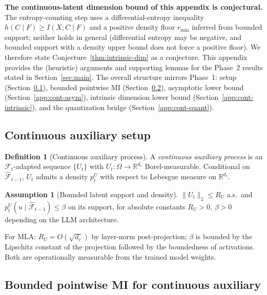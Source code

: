 \documentclass[11pt]{article}
\newcommand{\R}{\mathbb{R}}
\newcommand{\F}{\mathcal{F}}
\theoremstyle{plain}
\theoremstyle{definition}
\newtheorem{definition}[theorem]{Definition}
\newtheorem{assumption}[theorem]{Assumption}
\theoremstyle{remark}
\begin{document}
\textbf{The continuous-latent dimension bound of this appendix is
conjectural.} The entropy-counting step uses a differential-entropy
inequality $h(C\mid F)\ge I(X;C\mid F)$ and a positive density floor
$r_{\min}$ inferred from bounded support; neither holds in general
(differential entropy may be negative, and bounded support with a
density upper bound does not force a positive floor). We therefore
state Conjecture~\ref{thm:intrinsic-dim} as a conjecture. This appendix provides the (heuristic) arguments and supporting lemmas for the
Phase~2 results stated in Section~\ref{sec:main}. The
overall structure mirrors Phase~1: setup
(Section~\ref{app:cont-setup}), bounded pointwise MI
(Section~\ref{app:cont-pmi}), asymptotic lower bound
(Section~\ref{app:cont-asym}), intrinsic dimension lower bound
(Section~\ref{app:cont-intrinsic}), and the quantization bridge
(Section~\ref{app:cont-quant}).

\subsection{Continuous auxiliary setup}\label{app:cont-setup}

\begin{definition}[Continuous auxiliary process]\label{def:cont-aux-app}
A \emph{continuous auxiliary process} is an $\F_t$-adapted sequence
$\{U_t\}$ with $U_t : \Omega \to \R^{d_c}$ Borel-measurable. Conditional
on $\hat{\F}_{t-1}$, $U_t$ admits a density $p_t^U$ with respect to
Lebesgue measure on $\R^{d_c}$.
\end{definition}

\begin{assumption}[Bounded latent support and density]\label{ass:cont-support-app}
$\|U_t\|_2 \leq R_U$ a.s.\ and $p_t^U(u \mid \hat{\F}_{t-1}) \leq \beta$
on its support, for absolute constants $R_U > 0$, $\beta > 0$
depending on the LLM architecture.
\end{assumption}

For MLA: $R_U = O(\sqrt{d_c})$ by layer-norm post-projection; $\beta$
is bounded by the Lipschitz constant of the projection followed by the
boundedness of activations. Both are operationally measurable from the
trained model weights.

\subsection{Bounded pointwise MI for continuous auxiliary}\label{app:cont-pmi}
\end{document}
